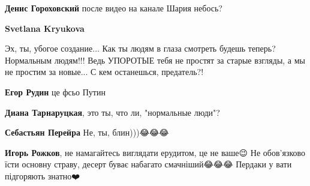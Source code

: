 \begin{itemize}
\begin{itemize}
 
\textbf{Денис Гороховский} после видео на канале Шария небось?

 
\textbf{Svetlana Kryukova}

Эх, ты, убогое создание... Как ты людям в глаза смотреть будешь теперь?
Нормальным людям!!! Ведь УПОРОТЫЕ тебя не простят за старые взгляды, а мы не
простим за новые... С кем останешься, предатель?!

 
\textbf{Егор Рудин} це фсьо Путин

 
\textbf{Диана Тарнаруцкая}, это ты, что ли, "нормальные люди"?

 
\textbf{Себастьян Перейра}
Не, ты, блин)))😂😂😂

 
\textbf{Игорь Рожков}, не намагайтесь виглядати ерудитом, це не ваше😉 Не обов'язково їсти основну страву, десерт буває набагато смачніший😂😂😂 Пердаки у вати підгоряють знатно❤️

 

\end{itemize}
\end{itemize}
